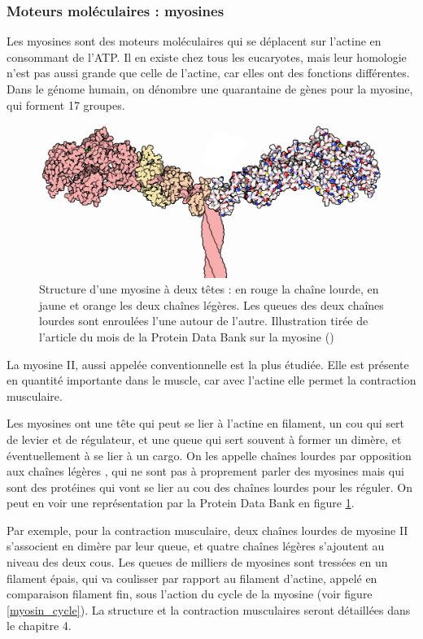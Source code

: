 \subsubsection{Moteurs moléculaires : myosines}

Les myosines sont des moteurs moléculaires qui se déplacent sur l'actine en consommant de l'ATP. Il en existe chez tous les eucaryotes, mais leur homologie n'est pas aussi grande que celle de l'actine, car elles ont des fonctions différentes. Dans le génome humain, on dénombre une quarantaine de gènes pour la myosine, qui forment 17 groupes.

\begin{figure}
\includegraphics[scale=3]{Figures/18-Myosin-1b7t.png} 
\caption{Structure d'une myosine à deux têtes : en rouge la chaîne lourde, en jaune et orange les deux chaînes légères. Les queues des deux chaînes lourdes sont enroulées l'une autour de l'autre. Illustration tirée de l'article du mois de la Protein Data Bank sur la myosine (\cite{goodsell_molecule_2010}) \label{myosin}}
\end{figure}

La myosine II, aussi appelée \og conventionnelle \fg  est la plus étudiée. Elle est présente en quantité importante dans le muscle, car avec l'actine elle permet la contraction musculaire. 

Les myosines ont une tête qui peut se lier à l'actine en filament, un cou  qui sert de levier et de régulateur, et une queue qui sert souvent à former un dimère, et éventuellement à se lier à un cargo. On les appelle \og chaînes lourdes \fg par opposition aux \og chaînes légères \fg, qui ne sont pas à proprement parler des myosines mais qui sont des protéines qui vont se lier au cou des \og chaînes lourdes \fg pour les réguler. On peut en voir une représentation par la Protein Data Bank en figure \ref{myosin}.

Par exemple, pour la contraction musculaire, deux chaînes lourdes de myosine II s'associent en dimère par leur queue, et quatre chaînes légères s'ajoutent au niveau des deux cous. Les queues de milliers de myosines sont tressées en un filament épais, qui va coulisser par rapport au filament d'actine, appelé en comparaison filament fin, sous l'action du cycle de la myosine (voir figure \ref{myosin_cycle}). La structure et la contraction musculaires seront détaillées dans le chapitre 4. 

